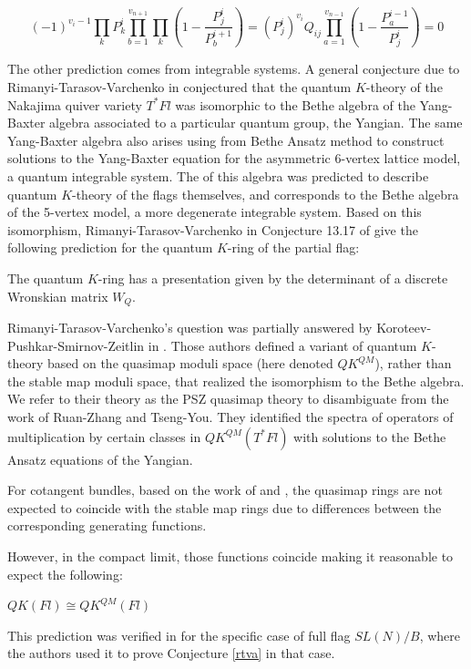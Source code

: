 \documentclass[11pt,letterpaper]{amsart}
\begin{document}
\begin{equation*}
(-1)^{v_i-1}\prod_k P^i_k\prod_{b=1}^{v_{n+1}}\prod_k(1-\frac{P^i_j}{P^{i+1}_b})=(P^i_j)^{v_i}Q_{ij}\prod_{a=1}^{v_{n-1}}(1-\frac{P^{i-1}_a}{P^{i}_j})=0
\end{equation*}

The other prediction comes from integrable systems. A general conjecture due to  Rimanyi-Tarasov-Varchenko in \cite{rimanyi2015trigonometric} conjectured that the quantum $K$-theory of the Nakajima quiver variety $T^*Fl$ was isomorphic to the Bethe algebra of the Yang-Baxter algebra associated to a particular quantum group, the Yangian. The same Yang-Baxter algebra also arises using from Bethe Ansatz method to construct solutions to the Yang-Baxter equation for the asymmetric 6-vertex lattice model, a quantum integrable system. The  of this algebra was predicted to describe quantum $K$-theory of the flags themselves, and corresponds to the Bethe algebra of the 5-vertex model, a more degenerate integrable system. Based on this isomorphism, Rimanyi-Tarasov-Varchenko in Conjecture 13.17 of \cite{rimanyi2015trigonometric} give the following prediction for the quantum $K$-ring of the partial flag:

\begin{conj}
\label{rtva}
The quantum $K$-ring has a presentation given by the determinant of a discrete Wronskian matrix $W_Q$. 
\end{conj}

Rimanyi-Tarasov-Varchenko's question was partially answered by Koroteev-Pushkar-Smirnov-Zeitlin in \cite{manybody}. Those authors defined a variant of quantum $K$-theory based on the quasimap moduli space (here denoted $QK^{QM}$), rather than the stable map moduli space, that realized the isomorphism to the Bethe algebra. We refer to their theory as the PSZ quasimap theory to disambiguate from the work of Ruan-Zhang and Tseng-You. They identified the spectra of operators of multiplication by certain classes in $QK^{QM}(T^*Fl)$ with solutions to the Bethe Ansatz equations of the Yangian. 

 For cotangent bundles, based on the work of \cite{Liu} and \cite{Xiaohan}, the quasimap rings are not expected to coincide with the stable map rings due to differences between the corresponding generating functions.

However, in the compact limit, those functions coincide making it reasonable to expect the following: 

\begin{conj}
    \label{iso}
    $QK(Fl)\cong QK^{QM}(Fl)$
\end{conj}
This prediction was verified in \cite{manybody} for the specific case of full flag $SL(N)/B$, where the authors used it to prove Conjecture \ref{rtva} in that case. 
\end{document}
